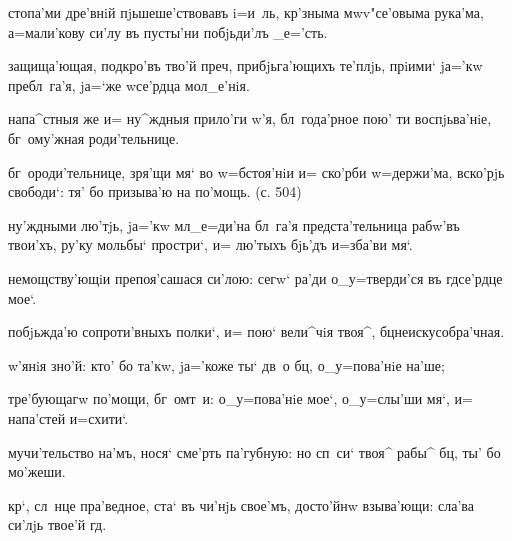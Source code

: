 


стопа'ми дре'внiй пjьшеше'ствовавъ i=и~ль, 
кр'зныма мwv"се'овыма рука'ма, а=мали'кову си'лу 
въ пусты'ни побjьди'лъ _е='сть.


защища'ющая, под\ъ кро'въ тво'й преч, прибjьга'ющихъ 
те'плjь, прiими` jа='кw пребл~га'я, jа=`же w\т се'рдца 
мол_е'нiя.

напа^стныя же и= ну^ждныя прило'ги w'я, 
бл~года'рное пою' ти воспjьва'нiе, бг~ому'жная 
роди'тельнице.

бг~ороди'тельнице, зря'щи мя` во w=бстоя'нiи и= ско'рби 
w=держи'ма, вско'рjь свободи`: тя' бо призыва'ю на 
по'мощь. (с. 504)

ну'ждными лю'тjь, jа='кw мл _е=ди'на бл~га'я 
предста'тельница рабw'въ твои'хъ, ру'ку мольбы` простри`, 
и= лю'тыхъ бjь'дъ и=зба'ви мя`.


немощству'ющiи препоя'сашася си'лою: сегw` ра'ди 
о_у=тверди'ся въ гд се'рдце мое`.

побjьжда'ю сопроти'вныхъ полки`, и= пою` вели^чiя твоя^, 
бц неискусобра'чная.

w'янiя зно'й: кто' бо та'кw, jа='коже ты` дв~о бц, 
о_у=пова'нiе на'ше;

тре'бующагw по'мощи, бг~омт~и: о_у=пова'нiе мое`, 
о_у=слы'ши мя`, и= напа'стей и=схити`.

мучи'тельство на'мъ, нося` сме'рть па'губную: но сп~си` 
твоя^ рабы^ бц, ты' бо мо'жеши.


кр`, сл~нце пра'ведное, ста` въ чи'нjь свое'мъ, 
досто'йнw взыва'ющи: сла'ва си'лjь твое'й гд.

